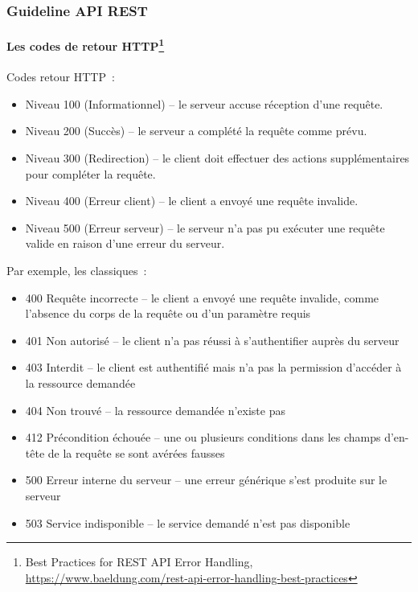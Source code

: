 \documentclass{beamer}
\begin{document}
    \begin{frame}
        \transdissolve
        \frametitle{Guideline API REST}
        \framesubtitle{Les codes de retour HTTP\footnote{Best Practices for REST API Error Handling, \url{https://www.baeldung.com/rest-api-error-handling-best-practices}}}
        Codes retour HTTP~:
        \begin{tiny}
            \begin{itemize}
                \item Niveau 100 (Informationnel) – le serveur accuse réception d'une requête.
                \item Niveau 200 (Succès) – le serveur a complété la requête comme prévu.
                \item Niveau 300 (Redirection) – le client doit effectuer des actions supplémentaires pour compléter la requête.
                \item Niveau 400 (Erreur client) – le client a envoyé une requête invalide.
                \item Niveau 500 (Erreur serveur) – le serveur n'a pas pu exécuter une requête valide en raison d'une erreur du serveur.
            \end{itemize}
        \end{tiny}
        Par exemple, les classiques~:
        \begin{tiny}
            \begin{itemize}
                \item 400 Requête incorrecte – le client a envoyé une requête invalide, comme l'absence du corps de la requête ou d'un paramètre requis
                \item 401 Non autorisé – le client n'a pas réussi à s'authentifier auprès du serveur
                \item 403 Interdit – le client est authentifié mais n'a pas la permission d'accéder à la ressource demandée
                \item 404 Non trouvé – la ressource demandée n'existe pas
                \item 412 Précondition échouée – une ou plusieurs conditions dans les champs d'en-tête de la requête se sont avérées fausses
                \item 500 Erreur interne du serveur – une erreur générique s'est produite sur le serveur
                \item 503 Service indisponible – le service demandé n'est pas disponible
            \end{itemize}
        \end{tiny}
    \end{frame}
\end{document}
